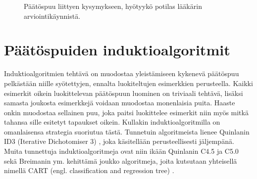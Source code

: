 \documentclass[12pt,finnish]{tktltiki2}
\theoremstyle{definition}
\theoremstyle{remark}
\begin{document}
\begin{figure}
\caption{Päätöspuu liittyen kysymykseen, hyötyykö potilas lääkärin arviointikäynnistä.}
\label{fig:Vuokaaviopäätöspuu}
\end{figure}

\section{Päätöspuiden induktioalgoritmit}
\label{sec:induktioalgoritmit}
Induktioalgoritmien tehtävä on muodostaa yleistämiseen kykenevä päätöspuu pelkästään niille
syötettyjen, ennalta luokiteltujen esimerkkien perusteella. Kaikki esimerkit oikein
luokittelevan päätöspuun luominen on triviaali tehtävä, lisäksi samasta joukosta esimerkkejä
voidaan muodostaa monenlaisia puita. Haaste onkin muodostaa sellainen puu, joka paitsi luokittelee
esimerkit niin myös mitkä tahansa sille esitetyt tapaukset oikein. Kullakin induktioalgoritmilla
on omanlaisensa strategia suoriutua tästä. Tunnetuin algoritmeista lienee Quinlanin ID3
(Iterative Dichotomiser 3) \cite{quinlan}, joka käsitellään perusteellisesti jäljempänä.
Muita tunnettuja induktioalgoritmeja ovat niin ikään Quinlanin C4.5 \cite{QuinlanC4_5} ja
C5.0 \cite{QuinlanC5_0} sekä Breimanin ym. kehittämä joukko algoritmeja, joita kutsutaan
yhteisellä nimellä CART (engl. classification and regression tree) \cite{CART}.
\end{document}
